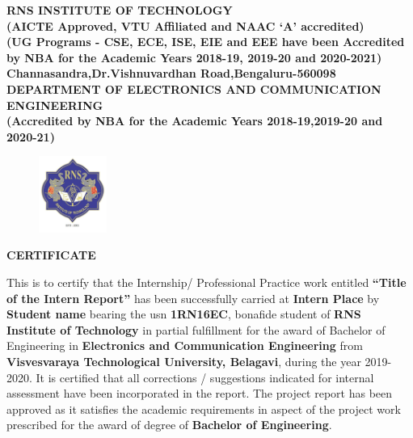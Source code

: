 %
\setlength{\toptafiddle}{1in}
\setlength{\bottafiddle}{1in}
\vspace*{-0.4in}
\enlargethispage{\bottafiddle}
\thispagestyle{empty}


\begin{center}
\small\textbf{{\color{blue}	RNS INSTITUTE OF TECHNOLOGY\\
(AICTE Approved, VTU Affiliated and NAAC `A' accredited)\\
(UG Programs - CSE, ECE, ISE, EIE and EEE have been Accredited by NBA for the Academic Years 2018-19, 2019-20 and 2020-2021)\\
Channasandra,Dr.Vishnuvardhan Road,Bengaluru-560098}\\
\vspace{0.3cm}
DEPARTMENT OF ELECTRONICS AND COMMUNICATION ENGINEERING\\
(Accredited by NBA for the Academic Years 2018-19,2019-20 and 2020-21)
}
\end{center}

\begin{center}
\begin{figure}[h]
\centering
\includegraphics[height=2.5cm]{images/rns1.jpg}
\end{figure}
\Large{\textbf{CERTIFICATE}}
\end{center}

This is to certify that the Internship/ Professional Practice work entitled \textbf{``Title of the Intern Report''} has been successfully carried at \textbf{Intern Place} by \textbf{Student name} bearing the usn \textbf{1RN16EC}, bonafide student of \textbf{\color{blue}RNS Institute of Technology} in partial fulfillment for the award of Bachelor of Engineering in \textbf{\color{blue}Electronics and Communication Engineering} from \textbf{\color{blue}Visvesvaraya Technological University, Belagavi}, during the year 2019-2020. It is certified that all corrections / suggestions indicated for internal assessment have been incorporated in the report. The project report has been approved as it satisfies the academic requirements in aspect of the project work prescribed for the award of degree of \textbf{\color{blue}Bachelor of Engineering}.

